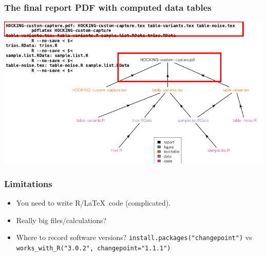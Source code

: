 \documentclass{beamer}
\begin{document}
\begin{frame}
  \frametitle{The final report PDF with computed data tables}
\includegraphics[width=\textwidth]{figure-code-dag-line1}
\end{frame}

\begin{frame}
  \frametitle{Limitations}
  \begin{itemize}
  \item You need to write R/\LaTeX\ code (complicated).
  \item Really big files/calculations?
  \item Where to record software versions?
    \texttt{install.packages("changepoint")} vs
    \texttt{works\_with\_R("3.0.2", changepoint="1.1.1")}
  \end{itemize}
\end{frame}
\end{document}
